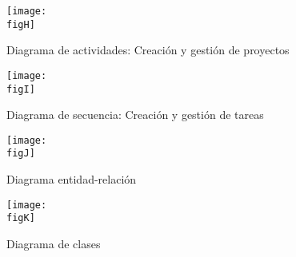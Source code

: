 	\begin{figure}[h]
		\centering
		\texttt{[image: \\figH]}
		\caption{Diagrama de actividades: Creación y gestión de proyectos}
	\end{figure}

	\begin{figure}[h]
		\centering
		\texttt{[image: \\figI]}
		\caption{Diagrama de secuencia: Creación y gestión de tareas}
	\end{figure}

	\begin{figure}[h]
		\centering
		\texttt{[image: \\figJ]}
		\caption{Diagrama entidad-relación}
	\end{figure}

	\begin{figure}[h]
		\centering
		\texttt{[image: \\figK]}
		\caption{Diagrama de clases}
	\end{figure}

